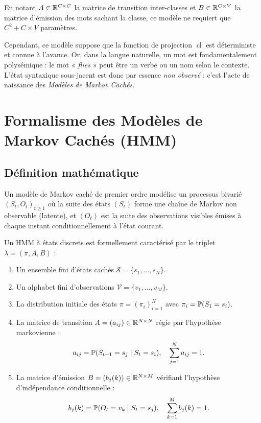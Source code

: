 En notant $A \in \mathbb{R}^{C \times C}$ la matrice de transition inter-classes et $B \in \mathbb{R}^{C \times V}$ la matrice d'émission des mots sachant la classe, ce modèle ne requiert que $C^2 + C \times V$ paramètres. 

Cependant, ce modèle suppose que la fonction de projection $\operatorname{cl}$ est déterministe et connue à l'avance. Or, dans la langue naturelle, un mot est fondamentalement polysémique : le mot « \emph{flies} » peut être un verbe ou un nom selon le contexte. L'état syntaxique sous-jacent est donc par essence \emph{non observé} : c'est l'acte de naissance des \emph{Modèles de Markov Cachés}.

\section{Formalisme des Modèles de Markov Cachés (HMM)}

\subsection{Définition mathématique}

Un modèle de Markov caché de premier ordre modélise un processus bivarié $(S_t, O_t)_{t \ge 1}$ où la suite des états $(S_t)$ forme une chaîne de Markov non observable (latente), et $(O_t)$ est la suite des observations visibles émises à chaque instant conditionnellement à l'état courant.

\begin{definition}
    Un HMM à états discrets est formellement caractérisé par le triplet $\lambda = (\pi, A, B)$ :
    \begin{enumerate}
        \item Un ensemble fini d'états cachés $\mathcal{S} = \{s_1, \dots, s_N\}$.
        \item Un alphabet fini d'observations $\mathcal{V} = \{v_1, \dots, v_M\}$.
        \item La distribution initiale des états $\pi = (\pi_i)_{i=1}^N$ avec $\pi_i = \mathbb{P}(S_1 = s_i)$.
        \item La matrice de transition $A = (a_{ij}) \in \mathbb{R}^{N \times N}$ régie par l'hypothèse markovienne :
        \begin{equation}
            a_{ij} = \mathbb{P}(S_{t+1} = s_j \mid S_t = s_i), \quad \sum_{j=1}^N a_{ij} = 1.
        \end{equation}
        \item La matrice d'émission $B = (b_j(k)) \in \mathbb{R}^{N \times M}$ vérifiant l'hypothèse d'indépendance conditionnelle :
        \begin{equation}
            b_j(k) = \mathbb{P}(O_t = v_k \mid S_t = s_j), \quad \sum_{k=1}^M b_j(k) = 1.
        \end{equation}
    \end{enumerate}
\end{definition}

